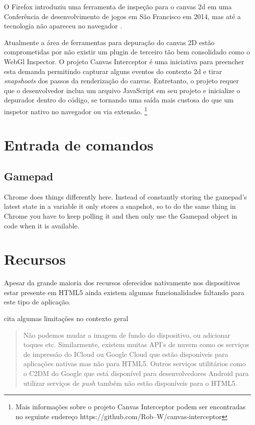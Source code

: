 \begin{draft}
O Firefox introduziu uma ferramenta de inspeção para o canvas 2d
em uma Conferência de desenvolvimento de jogos em São Francisco em 2014,
mas até a tecnologia não apareceu no navegador \autocite{firefoxCanvasDebug}.

Atualmente a área de ferramentas para depuração do canvas 2D estão
comprometidas por não existir um plugin de terceiro tão bem
consolidado como o WebGl Inspector. O projeto Canvas Interceptor é
uma iniciativa para preencher esta demanda permitindo capturar alguns
eventos do contexto 2d e tirar \textit{snapshoots} dos passos da renderização
do canvas. Entretanto, o projeto requer que o desenvolvedor inclua
um arquivo JavaScript em seu projeto e inicialize o depurador dentro do código,
se tornando uma saída mais custosa do que um inspetor nativo no
navegador ou via extensão. \footnote{Mais informações sobre o
projeto Canvas Interceptor podem ser encontradas no seguinte endereço
https://github.com/Rob--W/canvas-interceptor}

\section{Entrada de comandos}

\subsection{Gamepad}
Chrome does things differently here. Instead of constantly storing the gamepad's latest state in a variable it only stores a snapshot, so to do the same thing in Chrome you have to keep polling it and then only use the Gamepad object in code when it is available.

\section{Recursos}
Apesar da grande maioria dos recursos oferecidos nativamente
nos dispositivos estar presente em HTML5 ainda existem algumas
funcionalidades faltando para este tipo de aplicação.

\cite{html5Tradeoffs} cita algumas limitações no contexto geral
\begin{quote}
Não podemos mudar a imagem de fundo do dispositivo, ou adicionar toques
etc. Similarmente, existem muitas API's de nuvem como os serviços
de impressão do ICloud ou Google Cloud que estão disponíveis para
aplicações nativas mas não para HTML5. Outros serviços utilitários
como o C2DM do Google que está disponível para desenvolvedores Android
para utilizar serviços de \textit{push} também não estão disponíveis
para o HTML5.
\end{quote}


\end{draft}
